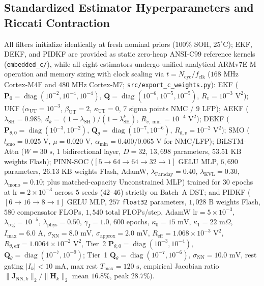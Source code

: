 \documentclass[11pt,a4paper]{article}
\begin{document}
\subsection{Standardized Estimator Hyperparameters and Riccati Contraction}
{\sloppy All filters initialize identically at fresh nominal priors ($100\%$ SOH, $25^\circ\text{C}$); EKF, DEKF, and PIDKF are provided as static zero-heap ANSI-C99 reference kernels (\texttt{embedded\_c/}), while all eight estimators undergo unified analytical ARMv7E-M operation and memory sizing with clock scaling via $t = N_{\text{cyc}}/f_{\text{clk}}$ ($168\text{ MHz}$ Cortex-M4F and $480\text{ MHz}$ Cortex-M7; \texttt{src/export\_c\_weights.py}): EKF ($\mathbf{P}_0 = \operatorname{diag}(10^{-2}, 10^{-4}, 10^{-4})$, $\mathbf{Q} = \operatorname{diag}(10^{-6}, 10^{-5}, 10^{-5})$, $R_v = 10^{-3}\text{ V}^2$); UKF ($\alpha_{\text{UT}} = 10^{-3}$, $\beta_{\text{UT}} = 2$, $\kappa_{\text{UT}} = 0$, $7$ sigma points NMC / $9$ LFP); AEKF ($\lambda_{\text{SH}} = 0.985$, $d_k = (1 - \lambda_{\text{SH}})/(1 - \lambda_{\text{SH}}^k)$, $R_{v,\min} = 10^{-4}\text{ V}^2$); DEKF ($\mathbf{P}_{\theta,0} = \operatorname{diag}(10^{-3}, 10^{-2})$, $\mathbf{Q}_\theta = \operatorname{diag}(10^{-7}, 10^{-6})$, $R_{\theta,v} = 10^{-2}\text{ V}^2$); SMO ($l_{\text{smo}} = 0.025\text{ V}$, $\mu = 0.020\text{ V}$, $\alpha_{\min} = 0.400/0.065\text{ V}$ for NMC/LFP); BiLSTM-Attn ($W = 30\text{ s}$, $1$ bidirectional layer, $D = 32$, $13,698$ parameters, $53.51\text{ KB}$ weights Flash); PINN-SOC ($[5 \rightarrow 64 \rightarrow 64 \rightarrow 32 \rightarrow 1]$ GELU MLP, $6,690$ parameters, $26.13\text{ KB}$ weights Flash, AdamW, $\lambda_{\text{Faraday}} = 0.40$, $\lambda_{\text{KVL}} = 0.30$, $\lambda_{\text{mono}} = 0.10$; plus matched-capacity Unconstrained MLP) trained for $30$ epochs at $\text{lr} = 2\times 10^{-3}$ across $5$ seeds ($42\text{--}46$) strictly on Batch~A DST; and PIDKF ($[6 \rightarrow 16 \rightarrow 8 \rightarrow 1]$ GELU MLP, $257$ \texttt{float32} parameters, $1,028\text{ B}$ weights Flash, $580$ compensator FLOPs, $1,540$ total FLOPs/step, AdamW $\text{lr} = 5\times 10^{-3}$, $\lambda_{\text{reg}} = 10^{-5}$, $\lambda_{\text{phys}} = 0.50$, $\gamma_I = 1.0$, $600$ epochs, $\kappa_0 = 15\text{ mV}$, $\kappa_1 = 22\text{ m}\Omega$, $I_{\max} = 6.0\text{ A}$, $\sigma_{\text{NN}} = 8.0\text{ mV}$, $\sigma_{\text{approx}} = 2.0\text{ mV}$, $R_{\text{eff}} = 1.068 \times 10^{-3}\text{ V}^2$, $R_{\theta,\text{eff}} = 1.0064 \times 10^{-2}\text{ V}^2$, Tier~2 $\mathbf{P}_{\theta,0} = \operatorname{diag}(10^{-3}, 10^{-4})$, $\mathbf{Q}_\theta = \operatorname{diag}(10^{-7}, 10^{-9})$; Tier~1 $\mathbf{Q}_\theta = \operatorname{diag}(10^{-7}, 10^{-6})$, $\sigma_{\text{NN}} = 10.0\text{ mV}$, rest gating $|I_k| < 10\text{ mA}$, max rest $T_{\max} = 120\text{ s}$, empirical Jacobian ratio $\|\mathbf{J}_{\text{NN},k}\|_2/\|\mathbf{H}_k\|_2$ mean $16.8\%$, peak $28.7\%$).

}
\end{document}
